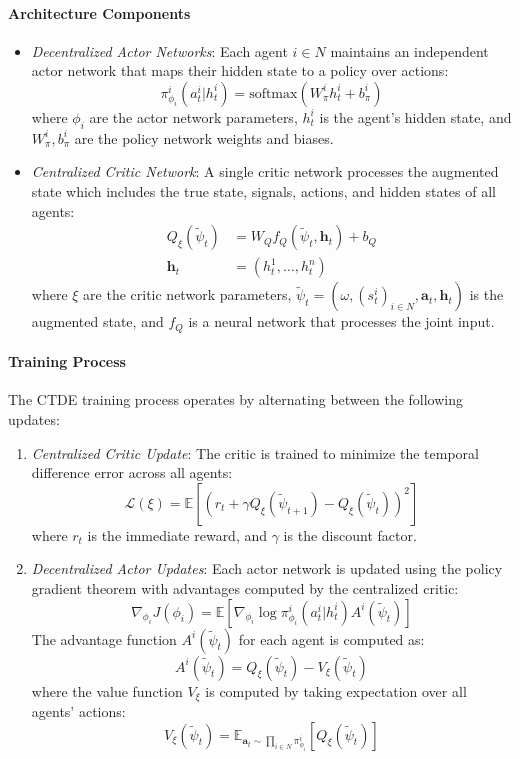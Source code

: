 \paragraph{Architecture Components}
\begin{itemize}
    \item \textit{Decentralized Actor Networks}: Each agent $i \in N$ maintains an independent actor network that maps their hidden state to a policy over actions:
    \[
        \pi^i_{\phi_i}(a^i_t|h^i_t) = \text{softmax}(W^i_{\pi}h^i_t + b^i_{\pi})
    \]
    where $\phi_i$ are the actor network parameters, $h^i_t$ is the agent's hidden state, and $W^i_{\pi}, b^i_{\pi}$ are the policy network weights and biases.
    
    \item \textit{Centralized Critic Network}: A single critic network processes the augmented state which includes the true state, signals, actions, and hidden states of all agents:
    \begin{align*}
        Q_{\xi}(\tilde{\psi}_t) &= W_Q f_Q(\tilde{\psi}_t, \mathbf{h}_t) + b_Q \\
        \mathbf{h}_t &= (h^1_t, \ldots, h^n_t)
    \end{align*}
    where $\xi$ are the critic network parameters, $\tilde{\psi}_t = (\omega, (s^i_t)_{i \in N}, \mathbf{a}_t, \mathbf{h}_t)$ is the augmented state, and $f_Q$ is a neural network that processes the joint input.
\end{itemize}

\paragraph{Training Process}
The CTDE training process operates by alternating between the following updates:

\begin{enumerate}
    \item \textit{Centralized Critic Update}: The critic is trained to minimize the temporal difference error across all agents:
    \[
        \mathcal{L}(\xi) = \mathbb{E}\left[(r_t + \gamma Q_{\xi}(\tilde{\psi}_{t+1}) - Q_{\xi}(\tilde{\psi}_t))^2\right]
    \]
    where $r_t$ is the immediate reward, and $\gamma$ is the discount factor.
    
    \item \textit{Decentralized Actor Updates}: Each actor network is updated using the policy gradient theorem with advantages computed by the centralized critic:
    \[
        \nabla_{\phi_i} J(\phi_i) = \mathbb{E}\left[\nabla_{\phi_i} \log \pi^i_{\phi_i}(a^i_t|h^i_t) A^i(\tilde{\psi}_t)\right]
    \]
    The advantage function $A^i(\tilde{\psi}_t)$ for each agent is computed as:
    \[
        A^i(\tilde{\psi}_t) = Q_{\xi}(\tilde{\psi}_t) - V_{\xi}(\tilde{\psi}_t)
    \]
    where the value function $V_{\xi}$ is computed by taking expectation over all agents' actions:
    \[
        V_{\xi}(\tilde{\psi}_t) = \mathbb{E}_{\mathbf{a}_t \sim \prod_{i \in N}\pi^i_{\phi_i}}[Q_{\xi}(\tilde{\psi}_t)]
    \]
\end{enumerate}

